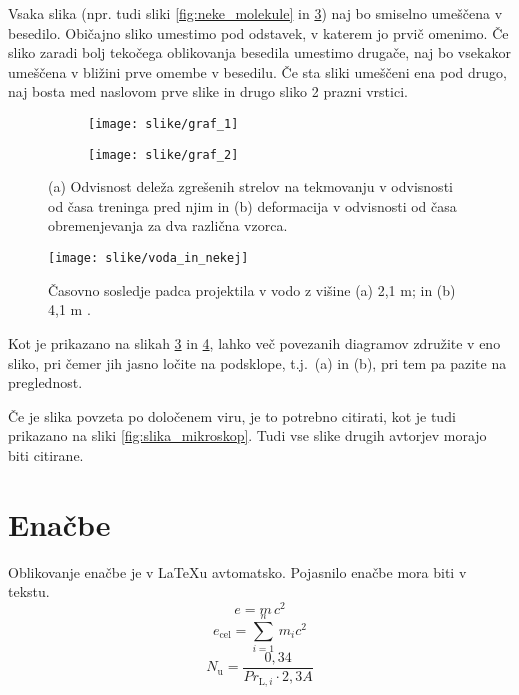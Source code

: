Vsaka slika (npr. tudi sliki \ref{fig:neke_molekule} in \ref{fig:2_grafa}) naj bo smiselno umeščena v besedilo. Običajno sliko umestimo pod odstavek, v katerem jo prvič omenimo. Če sliko zaradi bolj tekočega oblikovanja besedila umestimo drugače, naj bo vsekakor umeščena v bližini prve omembe v besedilu. Če sta sliki umeščeni ena pod drugo, naj bosta med naslovom prve slike in drugo sliko 2 prazni vrstici.

\begin{figure}
	\begin{subfigure}[b]{.45\linewidth}
		\centering \texttt{[image: slike/graf\_1]}
		\caption{}\label{subfig:graf1}
	\end{subfigure}%
	\quad
	\begin{subfigure}[b]{.45\linewidth}
		\centering \texttt{[image: slike/graf\_2]}
		\caption{}\label{subfig:graf2}
	\end{subfigure}
	
	\caption{(a) Odvisnost deleža zgrešenih strelov na tekmovanju v odvisnosti od časa treninga pred njim in (b) deformacija v odvisnosti od časa obremenjevanja za dva različna vzorca.}\label{fig:2_grafa}
\end{figure}

\begin{figure}[ht!]
	\begin{centering}
		\texttt{[image: slike/voda\_in\_nekej]}
		\caption{Časovno sosledje padca projektila v vodo z višine (a) 2,1 m; in (b) 4,1 m \cite{bazant_1991}.} \label{fig:voda_in_nekej}
	\end{centering}
\end{figure}

Kot je prikazano na slikah \ref{fig:2_grafa} in \ref{fig:voda_in_nekej}, lahko več povezanih diagramov združite v eno sliko, pri čemer jih jasno ločite na podsklope, t.j.\ (a) in (b), pri tem pa pazite na preglednost.

Če je slika povzeta po določenem viru, je to potrebno citirati, kot je tudi prikazano na sliki \ref{fig:slika_mikroskop}. Tudi vse slike drugih avtorjev morajo biti citirane.

\section{Enačbe}\label{sec:enacbe}

Oblikovanje enačbe je v \LaTeX u avtomatsko. Pojasnilo enačbe mora biti v tekstu.
\begin{equation}\label{eqn:e}
e = m\,c^2
\end{equation}
\begin{equation}\label{eqn:e_cel}
e_{\text{cel}}=\sum_{i=1}^{n}\,m_{i}c^2
\end{equation}
\begin{equation}\label{eqn:Nu}
N_{\text{u}} = \frac{0{,}34}{Pr_{\text{L},i}\cdot 2{,}3A}
\end{equation}

